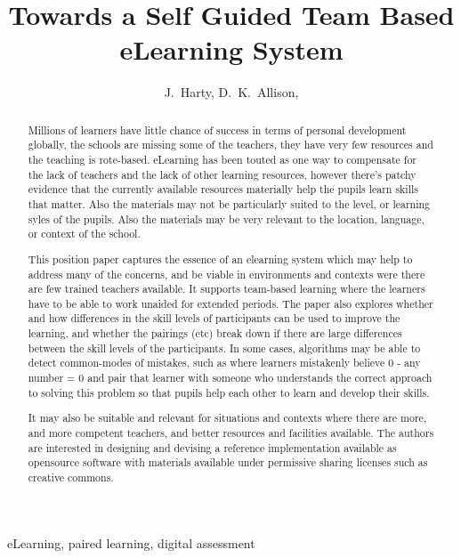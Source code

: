 \documentclass[11pt]{IEEEtran}
\begin{document}
\title{Towards a Self Guided Team Based eLearning System}

\author{J.~Harty, D.~K.~Allison,}

\maketitle


\begin{abstract}
Millions of learners have little chance of success in terms of personal 
development globally, the schools are missing some of the teachers, they have 
very few resources and the teaching is rote-based. eLearning has been touted as 
one way to compensate for the lack of teachers and the lack of other learning
resources, however there's patchy evidence that the currently available 
resources materially help the pupils learn skills that matter. Also the 
materials may not be particularly suited to the level, or learning syles of the 
pupils. Also the materials may be very relevant to the location, language, or 
context of the school.

This position paper captures the essence of an elearning system which may help 
to address many of the concerns, and be viable in environments and contexts were
there are few trained teachers available. It supports team-based learning where 
the learners have to be able to work unaided for extended periods. The paper 
also explores whether and how differences in the skill levels of participants 
can be used to improve the learning, and whether the pairings (etc) break down 
if there are large differences between the skill levels of the participants. In 
some cases, algorithms may be able to detect common-modes of mistakes, such as 
where learners mistakenly believe 0 - any number = 0 and pair that learner with 
someone who understands the correct approach to solving this problem so that 
pupils help each other to learn and develop their skills.

It may also be suitable and relevant for situations and contexts where there are
more, and more competent teachers, and better resources and facilities 
available. The authors are interested in designing and devising a reference
implementation available as opensource software with materials available under
permissive sharing licenses such as creative commons.
\end{abstract}

\begin{IEEEkeywords}
eLearning, paired learning, digital assessment
\end{IEEEkeywords}
\end{document}
